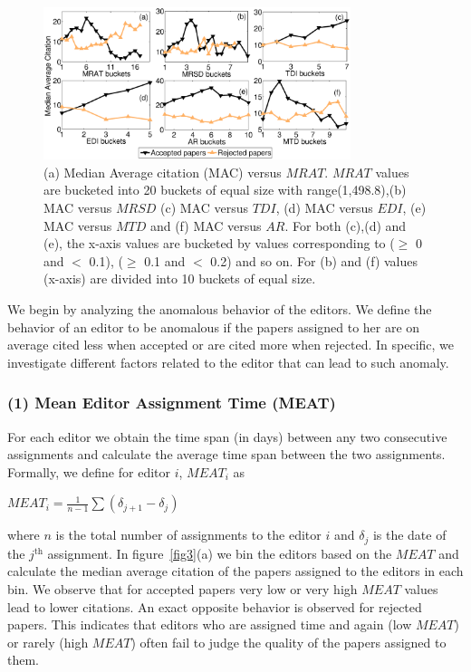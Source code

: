 \begin{figure}[!ht]
\centering
\includegraphics*[width=0.8\textwidth]{./texfiles/Chapter_4/cikm/figures/reviewer_all.eps}
\caption{\label{fig5}(a) Median Average citation (MAC) versus $MRAT$. $MRAT$ values are bucketed into 20 buckets of equal size with range(1,498.8),(b) MAC versus $MRSD$ (c) MAC versus $TDI$, (d) MAC versus $EDI$, (e) MAC versus $MTD$ and (f) MAC versus $AR$. For both (c),(d) and (e), the x-axis values are bucketed by values corresponding to ($\geq$ 0 and $<$ 0.1), ($\geq$ 0.1 and $<$ 0.2) and so on. For (b) and (f) values (x-axis) are divided into 10 buckets of equal size.}
\vspace{3mm}
\end{figure}

We begin by analyzing the anomalous behavior of the editors. We define the behavior of an editor to be anomalous if the papers assigned to her are on average cited less when accepted or are cited more when rejected. In specific, we investigate different factors related to the editor that can lead to such anomaly.

\subsubsection*{(1) Mean Editor Assignment Time (MEAT)}
For each editor we obtain the time span (in days) between any two consecutive assignments and calculate the average time span between the two assignments. 
Formally, we define for editor $i$, $MEAT_{i}$ as
\begin{center}
$MEAT_{i}=\frac{1}{n-1}\sum (\delta_{j+1} - \delta_{j})$
\end{center}
where $n$ is the total number of assignments to the editor $i$ and $\delta_{j}$ is the date of the $j$$^\textrm{th}$ assignment. 
In figure~\ref{fig3}(a) we bin the editors based on the $MEAT$ and calculate the median average citation of the papers assigned to the editors in each bin. 
{We observe that for accepted papers very low or very high $MEAT$ values lead to lower citations. An exact opposite behavior is observed for rejected papers. 
This indicates that editors who are assigned time and again (low $MEAT$) or rarely (high $MEAT$) often fail to judge the quality of the papers assigned to them.} 

